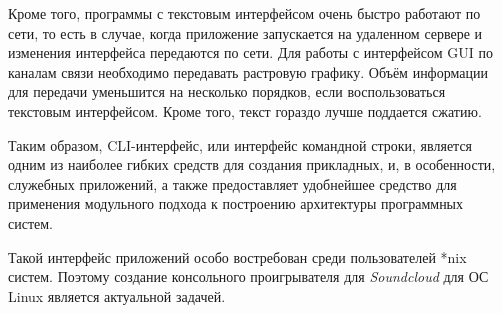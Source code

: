Кроме того, программы с текстовым интерфейсом очень быстро работают по
сети, то есть в случае, когда приложение запускается на удаленном
сервере и изменения интерфейса передаются по сети. Для работы с
интерфейсом GUI по каналам связи необходимо передавать растровую
графику. Объём информации для передачи уменьшится на несколько
порядков, если воспользоваться текстовым интерфейсом. Кроме того,
текст гораздо лучше поддается сжатию.

Таким образом, CLI-интерфейс, или интерфейс командной строки, является
одним из наиболее гибких средств 
для создания прикладных, и, в особенности, служебных приложений, а
также предоставляет удобнейшее средство для применения модульного
подхода к построению архитектуры программных систем.

Такой интерфейс приложений особо востребован среди пользователей *nix
систем. Поэтому создание консольного проигрывателя для
\textit{Soundcloud} для ОС Linux является актуальной задачей.

